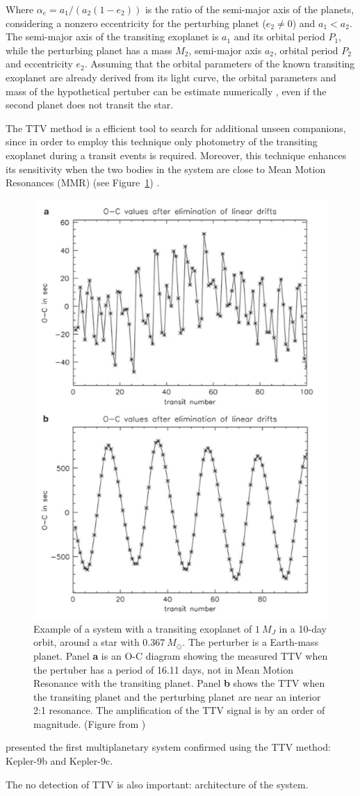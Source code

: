Where $\alpha_e = a_1/(a_2(1-e_2))$ is the ratio of the semi-major axis of the planets, considering a nonzero eccentricity for the perturbing planet ($e_2 \neq 0$) and $a_1 < a_2$. The semi-major axis of the transiting exoplanet is $a_1$ and its orbital period $P_1$, while the perturbing planet has a mass $M_2$, semi-major axis $a_2$, orbital period $P_2$ and eccentricity $e_2$. Assuming that the orbital parameters of the known transiting exoplanet are already derived from its light curve, the orbital parameters and mass of the hypothetical pertuber can be estimate numerically \citep{Nesvorny2008,Nesvorny2009}, even if the second planet does not transit the star. 

The TTV method is a efficient tool to search for additional unseen companions, since in order to employ this technique only photometry of the transiting exoplanet during a transit events is required. Moreover, this technique enhances its sensitivity when the two bodies in the system are close to Mean Motion Resonances (MMR) \citep{Agol2005,Steffen2005,Agol2007} (see Figure~\ref{rms_ttv_amplitude}) . 

\begin{figure}
\centering
\includegraphics[width=0.6\columnwidth]{imagenes/rms_ttv_amplitude}
\caption{Example of a system with a transiting exoplanet of $1~M_{J}$ in a 10-day orbit, around a star with $0.367~M_{\odot}$. The perturber is a Earth-mass planet. Panel \textbf{a} is an O-C diagram showing the measured TTV when the pertuber has a period of 16.11 days, not in Mean Motion Resonance with the transiting planet. Panel \textbf{b} shows the TTV when the transiting planet and the perturbing planet are near an interior 2:1 resonance. The amplification of the TTV signal is by an order of magnitude. (Figure from \cite{Haghighipour2011})}
\label{rms_ttv_amplitude}
\end{figure}

\cite{Holman2010} presented the first multiplanetary system confirmed using the TTV method: Kepler-9b and Kepler-9c. 

The no detection of TTV is also important: architecture of the system.


